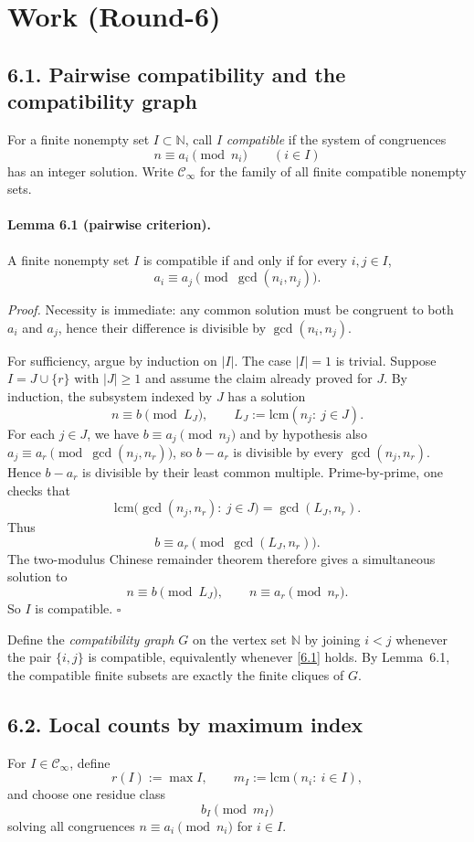 \section{Work (Round-6)}
\subsection*{6.1. Pairwise compatibility and the compatibility graph}
For a finite nonempty set $I\subset\mathbb N$, call $I$ \emph{compatible} if the system of congruences
\[
n\equiv a_i\pmod{n_i}\qquad(i\in I)
\]
has an integer solution.  Write $\mathcal C_\infty$ for the family of all finite compatible nonempty sets.

\paragraph{Lemma 6.1 (pairwise criterion).}
A finite nonempty set $I$ is compatible if and only if for every $i,j\in I$,
\begin{equation}
a_i\equiv a_j\pmod{\gcd(n_i,n_j)}.
\tag{6.1}
\end{equation}

\emph{Proof.}
Necessity is immediate: any common solution must be congruent to both $a_i$ and $a_j$, hence their difference is divisible by $\gcd(n_i,n_j)$.

For sufficiency, argue by induction on $|I|$.  The case $|I|=1$ is trivial.  Suppose $I=J\cup\{r\}$ with $|J|\ge 1$ and assume the claim already proved for $J$.  By induction, the subsystem indexed by $J$ has a solution
\[
n\equiv b\pmod{L_J},\qquad L_J:=\mathrm{lcm}(n_j:\ j\in J).
\]
For each $j\in J$, we have $b\equiv a_j\pmod{n_j}$ and by hypothesis also $a_j\equiv a_r\pmod{\gcd(n_j,n_r)}$, so $b-a_r$ is divisible by every $\gcd(n_j,n_r)$.  Hence $b-a_r$ is divisible by their least common multiple.  Prime-by-prime, one checks that
\[
\mathrm{lcm}\bigl(\gcd(n_j,n_r):\ j\in J\bigr)=\gcd(L_J,n_r).
\]
Thus
\[
b\equiv a_r\pmod{\gcd(L_J,n_r)}.
\]
The two-modulus Chinese remainder theorem therefore gives a simultaneous solution to
\[
n\equiv b\pmod{L_J},\qquad n\equiv a_r\pmod{n_r}.
\]
So $I$ is compatible.  \hfill $\square$

Define the \emph{compatibility graph} $G$ on the vertex set $\mathbb N$ by joining $i<j$ whenever the pair $\{i,j\}$ is compatible, equivalently whenever \eqref{6.1} holds.
By Lemma~6.1, the compatible finite subsets are exactly the finite cliques of $G$.

\subsection*{6.2. Local counts by maximum index}
For $I\in\mathcal C_\infty$, define
\[
r(I):=\max I,
\qquad
m_I:=\mathrm{lcm}(n_i:\ i\in I),
\]
and choose one residue class
\[
b_I\pmod{m_I}
\]
solving all congruences $n\equiv a_i\pmod{n_i}$ for $i\in I$.

